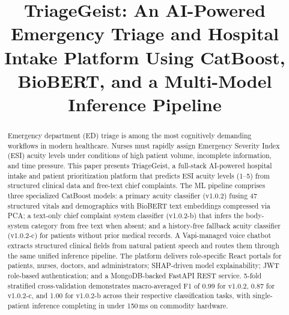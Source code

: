 \documentclass[conference]{IEEEtran}
\begin{document}
\title{TriageGeist: An AI-Powered Emergency Triage and Hospital Intake Platform Using CatBoost, BioBERT, and a Multi-Model Inference Pipeline}

\author{
  \and
  \and
  \and
}

\maketitle

\begin{abstract}
Emergency department (ED) triage is among the most cognitively demanding workflows in modern healthcare. Nurses must rapidly assign Emergency Severity Index (ESI) acuity levels under conditions of high patient volume, incomplete information, and time pressure. This paper presents TriageGeist, a full-stack AI-powered hospital intake and patient prioritization platform that predicts ESI acuity levels (1--5) from structured clinical data and free-text chief complaints. The ML pipeline comprises three specialized CatBoost models: a primary acuity classifier (v1.0.2) fusing 47 structured vitals and demographics with BioBERT text embeddings compressed via PCA; a text-only chief complaint system classifier (v1.0.2-b) that infers the body-system category from free text when absent; and a history-free fallback acuity classifier (v1.0.2-c) for patients without prior medical records. A Vapi-managed voice chatbot extracts structured clinical fields from natural patient speech and routes them through the same unified inference pipeline. The platform delivers role-specific React portals for patients, nurses, doctors, and administrators; SHAP-driven model explainability; JWT role-based authentication; and a MongoDB-backed FastAPI REST service. 5-fold stratified cross-validation demonstrates macro-averaged F1 of 0.99 for v1.0.2, 0.87 for v1.0.2-c, and 1.00 for v1.0.2-b across their respective classification tasks, with single-patient inference completing in under 150\,ms on commodity hardware.
\end{abstract}
\end{document}

